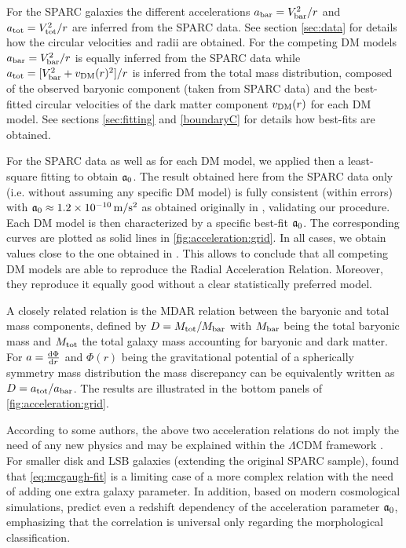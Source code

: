 For the SPARC galaxies the different accelerations $a_\mathrm{bar} = V_{\rm bar}^2/r$ and $a_\mathrm{tot} = V_{\rm tot}^2/r$ are inferred from the SPARC data. See section \ref{sec:data} for details how the circular velocities and radii are obtained. For the competing DM models $a_\mathrm{bar} = V_{\rm bar}^2/r$ is equally inferred from the SPARC data while $a_\mathrm{tot} = [V_{\rm bar}^2 + v_{\rm DM}(r)^2]/r$ is inferred from the total mass distribution, composed of the observed baryonic component (taken from SPARC data) and the best-fitted circular velocities of the dark matter component $v_{\rm DM}(r)$ for each DM model. See sections \ref{sec:fitting} and \ref{boundaryC} for details how best-fits are obtained.

For the SPARC data as well as for each DM model, we applied then a least-square fitting to obtain $\mathfrak{a}_0$. The result obtained here from the SPARC data only (i.e. without assuming any specific DM model) is fully consistent (within errors) with $\mathfrak{a}_0 \approx \SI{1.2E-10}{\metre\per\second^2}$ as obtained originally in \citet{2016PhRvL.117t1101M}, validating our procedure. Each DM model is then characterized by a specific best-fit $\mathfrak{a}_0$. The corresponding curves are plotted as solid lines in \cref{fig:acceleration:grid}. In all cases, we obtain values close to the one obtained in \citet{2016PhRvL.117t1101M}. This allows to conclude that all competing DM models are able to reproduce the Radial Acceleration Relation. Moreover, they reproduce it equally good without a clear statistically preferred model.

A closely related relation is the MDAR relation between the baryonic and total mass components, defined by $D = M_{\rm tot}/M_{\rm bar}$ with $M_{\rm bar}$ being the total baryonic mass and $M_{\rm tot}$ the total galaxy mass accounting for baryonic and dark matter. For $a = \frac{\mathrm{d}\Phi}{\mathrm{d} r}$ and $\Phi(r)$ being the gravitational potential of a spherically symmetry mass distribution the mass discrepancy can be equivalently written as $D = a_\mathrm{tot}/a_\mathrm{bar}$. The results are illustrated in the bottom panels of \cref{fig:acceleration:grid}.

According to some authors, the above two acceleration relations do not imply the need of any new physics and may be explained within the $\Lambda$CDM framework \citep{2016MNRAS.456L.127D,2017MNRAS.466.1648K,2016arXiv161208857S,2018FoPh...48.1517S}. For smaller disk and LSB galaxies (extending the original SPARC sample), \citet{2019ApJ...873..106D} found that \cref{eq:mcgaugh-fit} is a limiting case of a more complex relation with the need of adding one extra galaxy parameter. In addition, based on modern cosmological simulations, \citet{2017ApJ...835L..17K} predict even a redshift dependency of the acceleration parameter $\mathfrak{a}_0$, emphasizing that the correlation is universal only regarding the morphological classification.

